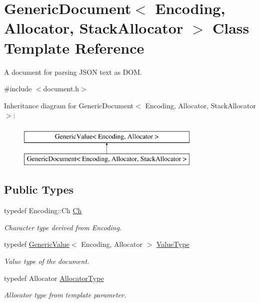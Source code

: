 \hypertarget{classGenericDocument}{}\section{Generic\+Document$<$ Encoding, Allocator, Stack\+Allocator $>$ Class Template Reference}
\label{classGenericDocument}


A document for parsing J\+S\+ON text as D\+OM.  




{\ttfamily \#include $<$document.\+h$>$}

Inheritance diagram for Generic\+Document$<$ Encoding, Allocator, Stack\+Allocator $>$\+:\begin{figure}[H]
\begin{center}
\leavevmode
\includegraphics[height=2.000000cm]{classGenericDocument}
\end{center}
\end{figure}
\subsection*{Public Types}
\begin{DoxyCompactItemize}
\item 
typedef Encoding\+::\+Ch \hyperlink{classGenericDocument_a6f5b0b7b6626508d094ae67490269700}{Ch}\hypertarget{classGenericDocument_a6f5b0b7b6626508d094ae67490269700}{}\label{classGenericDocument_a6f5b0b7b6626508d094ae67490269700}

\begin{DoxyCompactList}\small\item\em Character type derived from Encoding. \end{DoxyCompactList}\item 
typedef \hyperlink{classGenericValue}{Generic\+Value}$<$ Encoding, Allocator $>$ \hyperlink{classGenericDocument_a8936205dc215dda029060d7e835e0549}{Value\+Type}\hypertarget{classGenericDocument_a8936205dc215dda029060d7e835e0549}{}\label{classGenericDocument_a8936205dc215dda029060d7e835e0549}

\begin{DoxyCompactList}\small\item\em Value type of the document. \end{DoxyCompactList}\item 
typedef Allocator \hyperlink{classGenericDocument_a35155b912da66ced38d22e2551364c57}{Allocator\+Type}\hypertarget{classGenericDocument_a35155b912da66ced38d22e2551364c57}{}\label{classGenericDocument_a35155b912da66ced38d22e2551364c57}

\begin{DoxyCompactList}\small\item\em Allocator type from template parameter. \end{DoxyCompactList}\end{DoxyCompactItemize}
